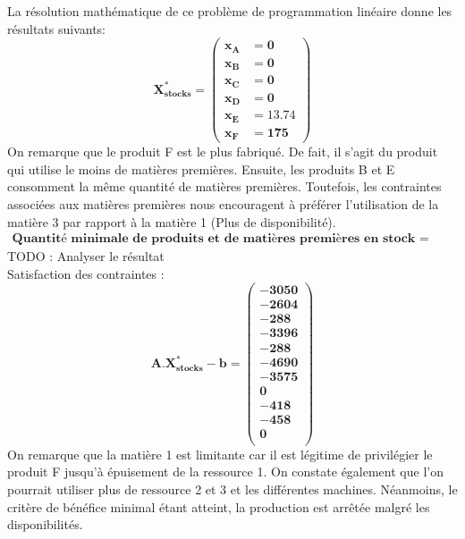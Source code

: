 \documentclass[12pt]{article}
\begin{document}
La résolution mathématique de ce problème de programmation linéaire donne les résultats suivants:
\begin{equation*}
\boldsymbol{X^{*}_{stocks} = 
   \left (
   \begin{aligned}
      x_{A} &= 0 \\
      x_{B} &= 0 \\
      x_{C} &= 0 \\
      x_{D} &= 0 \\
      x_{E} &= 13.74 \\
      x_{F} &= 175 
   \end{aligned}
   \right )
 } 
\end{equation*}
On remarque que le produit F est le plus fabriqué. De fait, il s'agit du produit qui utilise le moins de matières premières. Ensuite, les produits B et E consomment la même quantité de matières premières. Toutefois, les contraintes associées aux matières premières nous encouragent à préférer l'utilisation de la matière 3 par rapport à la matière 1 (Plus de disponibilité).
\begin{align*}
\textbf{Quantité minimale de produits et de matières premières en stock = 768.70}
\end{align*}
TODO : Analyser le résultat\\
Satisfaction des contraintes : 
\begin{equation*}
\boldsymbol{A.X^{*}_{stocks} - b = 
   \left (
   \begin{aligned}
      -3050 \\
      -2604 \\
      -288 \\
      -3396\\
      -288 \\
      -4690 \\
      -3575 \\
      0\\
      -418 \\
      -458\\
      0\\
   \end{aligned}
   \right )
 } 
\end{equation*}
On remarque que la matière 1 est limitante car il est légitime de privilégier le produit F jusqu'à épuisement de la ressource 1.
On constate également que l'on pourrait utiliser plus de ressource 2 et 3 et les différentes machines. Néanmoins, le critère de bénéfice minimal étant atteint, la production est arrêtée malgré les disponibilités.
\end{document}
